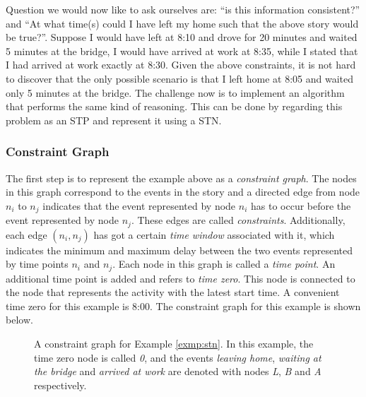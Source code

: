 \documentclass{article}
\theoremstyle{definition}
\begin{document}
Question we would now like to ask ourselves are: ``is this information consistent?'' and ``At what time(s) could I have left my home such that the above story would be true?''. 
Suppose I would have left at 8:10 and drove for 20 minutes and waited 5 minutes at the bridge, I would have arrived at work at 8:35, while I stated that I had arrived at work exactly at 8:30. 
Given the above constraints, it is not hard to discover that the only possible scenario is that I left home at 8:05 and waited only 5 minutes at the bridge.
The challenge now is to implement an algorithm that performs the same kind of reasoning. This can be done by regarding this problem as an STP and represent it using a STN.

\subsubsection{Constraint Graph}
The first step is to represent the example above as a \emph{constraint graph}. 
The nodes in this graph correspond to the events in the story and a directed edge from node $n_i$ to $n_j$ indicates that the event represented by node $n_i$ has to occur before the event represented by node $n_j$.
These edges are called \emph{constraints}. Additionally, each edge $(n_i, n_j)$ has got a certain \emph{time window} associated with it, which indicates the minimum and maximum delay between the two events represented by time points $n_i$ and $n_j$. 
Each node in this graph is called a \emph{time point}. 
An additional time point is added and refers to \emph{time zero}. This node is connected to the node that represents the activity with the latest start time.
A convenient time zero for this example is 8:00.
The constraint graph for this example is shown below. 

\begin{figure}[h]
	\centering
	\caption{A constraint graph for Example \ref{exmp:stn}. In this example, the time zero node is called \emph{0}, and the events \emph{leaving home},  \emph{waiting at the bridge} and \emph{arrived at work} are denoted with nodes \emph{L}, \emph{B} and \emph{A} respectively.}
\end{figure}
\end{document}
